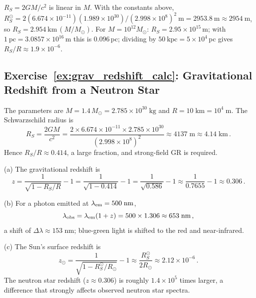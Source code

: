 \begin{derivation}
$R_S = 2GM/c^2$ is linear in $M$. With the constants above,
$R_S^\odot = 2(6.674\times10^{-11})(1.989\times10^{30})/(2.998\times10^{8})^2\ \text{m} = 2953.8\ \text{m}
\approx 2954\ \text{m}$, so $R_S = 2.954\ \text{km}\,(M/M_\odot)$.
For $M = 10^{12} M_\odot$: $R_S = 2.95\times10^{15}$\,m; with
$1\ \text{pc} = 3.0857\times10^{16}$\,m this is $0.096$\,pc; dividing by
$50\ \text{kpc} = 5\times10^{4}$\,pc gives $R_S/R \approx 1.9\times10^{-6}$.
\end{derivation}

\subsection*{Exercise~\ref{ex:grav_redshift_calc}: Gravitational Redshift from a Neutron Star}

The parameters are $M = 1.4\, M_\odot = 2.785\times 10^{30}\;\text{kg}$ and
$R = 10\;\text{km} = 10^{4}\;\text{m}$.
The Schwarzschild radius is
\begin{equation*}
    R_S = \frac{2GM}{c^2}
        = \frac{2 \times 6.674\times 10^{-11} \times 2.785\times 10^{30}}
               {(2.998\times 10^{8})^2}
        \approx 4137\;\text{m}
        \approx 4.14\;\text{km} \,.
\end{equation*}
Hence $R_S/R \approx 0.414$, a large fraction, and strong-field GR is required.

(a) The gravitational redshift is
\begin{equation*}
    z = \frac{1}{\sqrt{1 - R_S/R}} - 1
      = \frac{1}{\sqrt{1 - 0.414}} - 1
      = \frac{1}{\sqrt{0.586}} - 1
      \approx \frac{1}{0.7655} - 1
      \approx 0.306 \,.
\end{equation*}

(b) For a photon emitted at $\lambda_{\rm em} = 500\;\text{nm}$,
\begin{equation*}
    \lambda_{\rm obs} = \lambda_{\rm em}(1 + z)
                      = 500 \times 1.306
                      \approx 653\;\text{nm} \,,
\end{equation*}
a shift of $\Delta\lambda \approx 153\;\text{nm}$; blue-green light is shifted
to the red and near-infrared.

(c) The Sun's surface redshift is
\begin{equation*}
    z_\odot = \frac{1}{\sqrt{1 - R_S^\odot / R_\odot}} - 1
            \approx \frac{R_S^\odot}{2 R_\odot}
            \approx 2.12\times 10^{-6} \,.
\end{equation*}
The neutron star redshift ($z \approx 0.306$) is roughly $1.4\times 10^{5}$ times
larger, a difference that strongly affects observed neutron star spectra.


